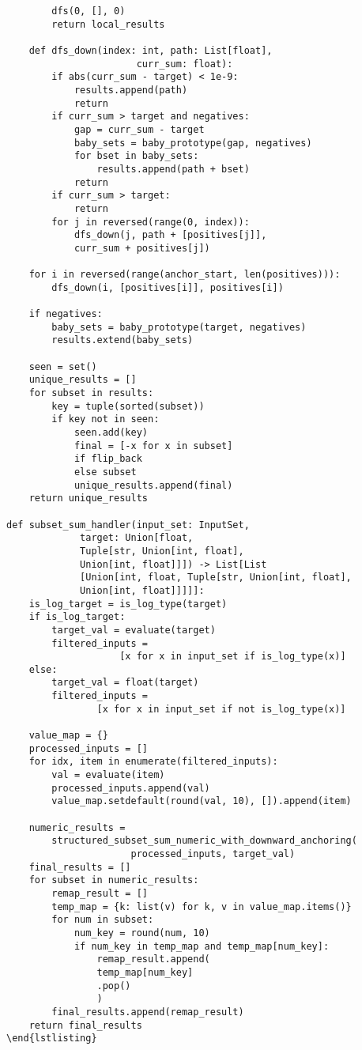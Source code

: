 \documentclass[11pt]{article}
\begin{document}
\begin{verbatim}
        dfs(0, [], 0)
        return local_results

    def dfs_down(index: int, path: List[float],
                       curr_sum: float):
        if abs(curr_sum - target) < 1e-9:
            results.append(path)
            return
        if curr_sum > target and negatives:
            gap = curr_sum - target
            baby_sets = baby_prototype(gap, negatives)
            for bset in baby_sets:
                results.append(path + bset)
            return
        if curr_sum > target:
            return
        for j in reversed(range(0, index)):
            dfs_down(j, path + [positives[j]],
            curr_sum + positives[j])

    for i in reversed(range(anchor_start, len(positives))):
        dfs_down(i, [positives[i]], positives[i])

    if negatives:
        baby_sets = baby_prototype(target, negatives)
        results.extend(baby_sets)

    seen = set()
    unique_results = []
    for subset in results:
        key = tuple(sorted(subset))
        if key not in seen:
            seen.add(key)
            final = [-x for x in subset]
            if flip_back
            else subset
            unique_results.append(final)
    return unique_results

def subset_sum_handler(input_set: InputSet, 
             target: Union[float,
             Tuple[str, Union[int, float],
             Union[int, float]]]) -> List[List
             [Union[int, float, Tuple[str, Union[int, float],
             Union[int, float]]]]]:
    is_log_target = is_log_type(target)
    if is_log_target:
        target_val = evaluate(target)
        filtered_inputs =
                    [x for x in input_set if is_log_type(x)]
    else:
        target_val = float(target)
        filtered_inputs = 
                [x for x in input_set if not is_log_type(x)]

    value_map = {}
    processed_inputs = []
    for idx, item in enumerate(filtered_inputs):
        val = evaluate(item)
        processed_inputs.append(val)
        value_map.setdefault(round(val, 10), []).append(item)

    numeric_results = 
        structured_subset_sum_numeric_with_downward_anchoring(
                      processed_inputs, target_val)
    final_results = []
    for subset in numeric_results:
        remap_result = []
        temp_map = {k: list(v) for k, v in value_map.items()}
        for num in subset:
            num_key = round(num, 10)
            if num_key in temp_map and temp_map[num_key]:
                remap_result.append(
                temp_map[num_key]
                .pop()
                )
        final_results.append(remap_result)
    return final_results
\end{lstlisting}
\end{verbatim}
\normalsize
\end{document}

